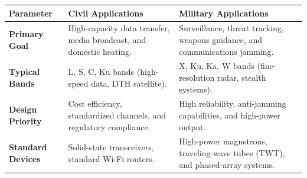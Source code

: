 \documentclass[12pt,a4paper]{article}
\renewcommand{\arraystretch}{1.45}
\begin{document}
\begin{tcolorbox}[tikzbox, title={Comparison of Civil and Military Microwave Applications}]
\renewcommand{\arraystretch}{1.4}
\par\noindent
{\renewcommand{\arraystretch}{1.55}%
\begin{tabularx}{\linewidth}{|B{3.0cm}|Y|Y|}\hline
\textbf{Parameter} & \textbf{\color{myteal}Civil Applications} & \textbf{\color{myred}Military Applications} \\[4pt]
\hline
\textbf{Primary Goal} & High-capacity data transfer, media broadcast, and domestic heating. & Surveillance, threat tracking, weapons guidance, and communications jamming. \\[4pt]
\hline
\textbf{Typical Bands} & L, S, C, Ku bands (high-speed data, DTH satellite). & X, Ku, Ka, W bands (fine-resolution radar, stealth systems). \\[4pt]
\hline
\textbf{Design Priority} & Cost efficiency, standardized channels, and regulatory compliance. & High reliability, anti-jamming capabilities, and high-power output. \\[4pt]
\hline
\textbf{Standard Devices} & Solid-state transceivers, standard Wi-Fi routers. & High-power magnetrons, traveling-wave tubes (TWT), and phased-array systems. \\[4pt]
\hline
\end{tabularx}
}
\end{tcolorbox}
\end{document}
